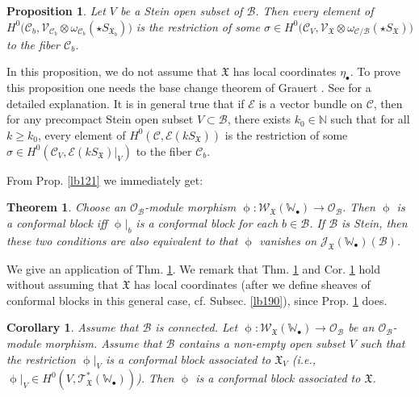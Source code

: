 \documentclass[11pt,b5paper,notitlepage]{article}
\theoremstyle{definition}
\theoremstyle{plain}
\newtheorem{thm}[df]{Theorem}
\newtheorem{pp}[df]{Proposition}
\newtheorem{co}[df]{Corollary}
\newcommand{\fk}{\mathfrak}
\newcommand{\mc}{\mathcal}
\newcommand{\scr}{\mathscr}
\newcommand{\SX}{{S_{\fk X}}}
\newcommand{\blt}{\bullet}
\newcommand{\Wbb}{\mathbb W}
\newcommand{\Nbb}{\mathbb N}
\newcommand{\SXb}{{S_{\fk X_b}}}
\numberwithin{equation}{section}
\begin{document}
\begin{pp}\label{lb122}
Let $V$ be a Stein open subset of $\mc B$. Then every element of $H^0\big(\mc C_b,\scr V_{\mc C_b}\otimes\omega_{\mc C_b}(\star\SXb)\big)$ is the restriction of some $\sigma\in H^0\big(\mc C_V,\scr V_{\fk X}\otimes\omega_{\mc C/\mc B}(\star\SX)\big)$ to the fiber $\mc C_b$.
\end{pp}


In this proposition, we do not assume that $\fk X$ has local coordinates $\eta_\blt$. To prove this proposition one needs the base change theorem of Grauert \cite[Sec. III.4.2]{GR-b}. See  \cite[Sec. 2.5]{Gui} for a detailed explanation. It is in general true that if $\scr E$ is a vector bundle on $\mc C$, then for any precompact Stein open subset $V\subset\mc B$, there exists $k_0\in\Nbb$ such that for all $k\geq k_0$, every element of $H^0(\mc C,\scr E(k\SX))$ is the restriction of some $\sigma \in H^0(\mc C_V,\scr E(k\SX)|_V)$ to the fiber $\mc C_b$.


From Prop. \ref{lb121} we immediately get:

\begin{thm}\label{lb143}
Choose an $\scr O_{\mc B}$-module morphism $\upphi:\scr W_{\fk X}(\Wbb_\blt)\rightarrow\scr O_{\mc B}$. Then $\upphi$ is a conformal block iff $\upphi|_b$ is a conformal block for each $b\in\mc B$. If $\mc B$ is Stein, then these two conditions are also equivalent to that $\upphi$ vanishes on $\scr J_{\fk X}(\Wbb_\blt)(\mc B)$.
\end{thm}


We give an application of Thm. \ref{lb143}. We remark that Thm. \ref{lb143} and Cor. \ref{lb158} hold without assuming that $\fk X$ has local coordinates (after we define sheaves of conformal blocks in this general case, cf. Subsec. \ref{lb190}), since Prop. \ref{lb122} does.



\begin{co}\label{lb158}
Assume that $\mc B$ is connected. Let $\upphi:\scr W_{\fk X}(\Wbb_\blt)\rightarrow\scr O_{\mc B}$ be an $\scr O_{\mc B}$-module morphism. Assume that $\mc B$ contains a non-empty open subset $V$ such that the restriction $\upphi|_V$ is a conformal block associated to $\fk X_V$ (i.e., $\upphi|_V\in H^0(V,\scr T_{\fk X}^*(\Wbb_\blt))$). Then $\upphi$ is a conformal block associated to $\fk X$.
\end{co}
\end{document}
